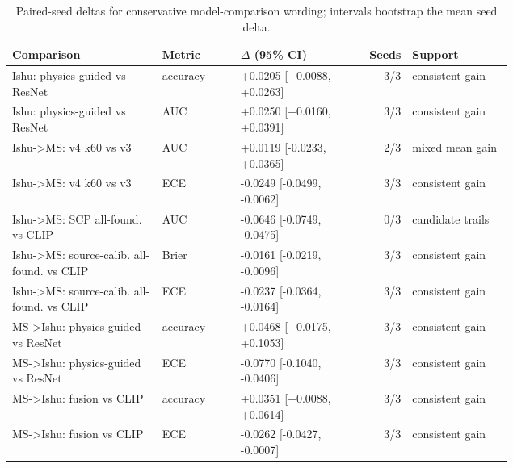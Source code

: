 \begin{table}[t]
\centering
\small
\caption{Paired-seed deltas for conservative model-comparison wording; intervals bootstrap the mean seed delta.}
\label{tab:paired-seed-support}
\begin{tabular}{p{0.30\linewidth} l p{0.22\linewidth} r p{0.20\linewidth}}
\toprule
Comparison & Metric & $\Delta$ (95\% CI) & Seeds & Support \\
\midrule
Ishu: physics-guided vs ResNet & accuracy & +0.0205 [+0.0088, +0.0263] & 3/3 & consistent gain \\
Ishu: physics-guided vs ResNet & AUC & +0.0250 [+0.0160, +0.0391] & 3/3 & consistent gain \\
Ishu->MS: v4 k60 vs v3 & AUC & +0.0119 [-0.0233, +0.0365] & 2/3 & mixed mean gain \\
Ishu->MS: v4 k60 vs v3 & ECE & -0.0249 [-0.0499, -0.0062] & 3/3 & consistent gain \\
Ishu->MS: SCP all-found. vs CLIP & AUC & -0.0646 [-0.0749, -0.0475] & 0/3 & candidate trails \\
Ishu->MS: source-calib. all-found. vs CLIP & Brier & -0.0161 [-0.0219, -0.0096] & 3/3 & consistent gain \\
Ishu->MS: source-calib. all-found. vs CLIP & ECE & -0.0237 [-0.0364, -0.0164] & 3/3 & consistent gain \\
MS->Ishu: physics-guided vs ResNet & accuracy & +0.0468 [+0.0175, +0.1053] & 3/3 & consistent gain \\
MS->Ishu: physics-guided vs ResNet & ECE & -0.0770 [-0.1040, -0.0406] & 3/3 & consistent gain \\
MS->Ishu: fusion vs CLIP & accuracy & +0.0351 [+0.0088, +0.0614] & 3/3 & consistent gain \\
MS->Ishu: fusion vs CLIP & ECE & -0.0262 [-0.0427, -0.0007] & 3/3 & consistent gain \\
\bottomrule
\end{tabular}
\end{table}
